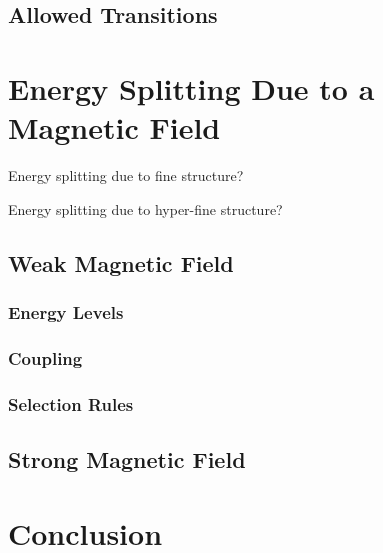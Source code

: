 \documentclass[12pt]{article}
\begin{document}
	\subsection{Allowed Transitions}

\section{Energy Splitting Due to a Magnetic Field}
        Energy splitting due to fine structure?

        Energy splitting due to hyper-fine structure?

	\subsection{Weak Magnetic Field}
		\subsubsection{Energy Levels}
		\subsubsection{Coupling}
		\subsubsection{Selection Rules}

	\subsection{Strong Magnetic Field}

\section{Conclusion}



\end{document}
